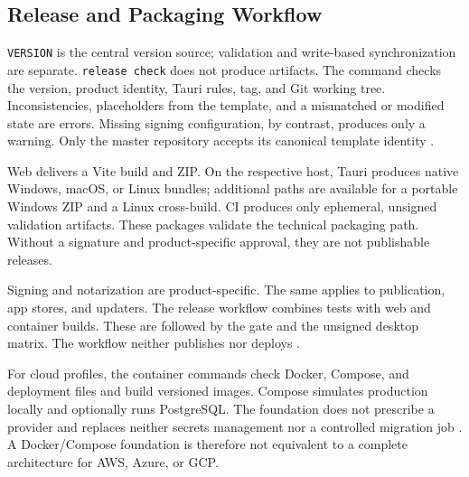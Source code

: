 \subsection{Release and Packaging Workflow}
\label{subsec:release-packaging-workflow}

\texttt{VERSION} is the central version source; validation and write-based
synchronization are separate. \texttt{release check} does not produce
artifacts. The command checks the version, product identity, Tauri rules, tag,
and Git working tree. Inconsistencies, placeholders from the template, and a
mismatched or modified state are errors. Missing signing configuration, by
contrast, produces only a warning.
Only the master repository accepts its canonical template identity
\parencite{kleiveist2026release,kleiveist2026control}.

Web delivers a Vite build and ZIP. On the respective host, Tauri produces
native Windows, macOS, or Linux bundles; additional paths are available for a
portable Windows ZIP and a Linux cross-build. CI produces only ephemeral,
unsigned validation artifacts.
These packages validate the technical packaging path. Without a signature and
product-specific approval, they are not publishable releases.



Signing and notarization are product-specific. The same applies to
publication, app stores, and updaters. The release workflow combines tests
with web and container builds. These are followed by the gate and the unsigned
desktop matrix. The workflow neither publishes nor deploys
\parencite{kleiveist2026release,kleiveist2026ci}.

For cloud profiles, the container commands check Docker, Compose, and
deployment files and build versioned images. Compose simulates production
locally and optionally runs PostgreSQL. The foundation does not prescribe a
provider and replaces neither secrets management nor a controlled migration
job
\parencite{kleiveist2026container,kleiveist2026deployment}.
A Docker/Compose foundation is therefore not equivalent to a complete
architecture for AWS, Azure, or GCP.
